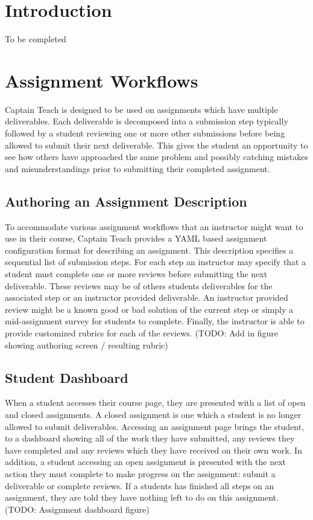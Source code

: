 \documentclass{sig-alternate}
\begin{document}

\section{Introduction}
To be completed


\section{Assignment Workflows}
Captain Teach is designed to be used on assignments which have multiple
deliverables. Each deliverable is decomposed into a submission step typically
followed by a student reviewing one or more other submissions before being
allowed to submit their next deliverable. This gives the student an
opportunity to see how others have approached the same problem and possibly
catching mistakes and misunderstandings prior to submitting their completed
assignment.

\subsection{Authoring an Assignment Description}
To accommodate various assignment workflows that an instructor might want to use
in their course, Captain Teach provides a YAML based assignment configuration 
format for describing an assignment. This description specifies a sequential 
list of submission steps. For each step an instructor may specify that a 
student must complete one or more reviews before submitting the next deliverable.
These reviews may be of others students deliverables for the associated step or 
an instructor provided deliverable. An instructor provided review might be a
known good or bad solution of the current step or simply a mid-assignment 
survey for students to complete. Finally, the instructor is able to provide
customized rubrics for each of the reviews. (TODO: Add in figure showing authoring screen / resulting rubric)


\subsection{Student Dashboard}
When a student accesses their course page, they are presented with a list of
open and closed assignments. A closed assignment is one which a student
is no longer allowed to submit deliverables.
Accessing an assignment page brings the student,
to a dashboard showing all of the work they have submitted, any reviews
they have completed and any reviews which they have received on their own work.
In addition, a student accessing an open assignment is presented with the next
action they must complete to make progress on the assignment: submit a 
deliverable or complete reviews. If a students has finished all steps on an
assignment, they are told they have nothing left to do on this assignment. (TODO: Assignment dashboard figure)
\end{document}
